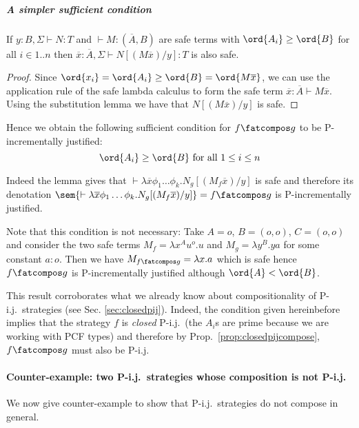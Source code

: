 \subparagraph{A simpler sufficient condition}
\begin{lemma}
If $y:B, \Sigma \vdash N : T$ and $\vdash M : (\overline{A}, B)$
are safe terms with $\ord{A_i} \geq \ord{B}$ for all $i\in 1..n$
then $\overline{x}:\overline{A}, \Sigma \vdash N[(M \overline{x})/y] :T$ is also safe.
\end{lemma}
\begin{proof}
Since $\ord{x_i} = \ord{A_i} \geq \ord{B} = \ord{M \overline{x}}$, we can use the application
rule of the safe lambda calculus to form the safe term $\overline{x}:\overline{A} \vdash M \overline{x}$.
Using the substitution lemma we have that $N[(M \overline{x})/y]$ is safe.
\end{proof}

Hence we obtain the following sufficient condition for $f\fatcompos
g$ to be P-incrementally justified:
$$\ord{A_i}\geq\ord{B} \mbox{ for all } 1 \leq i \leq n$$


Indeed the lemma gives that $\vdash \lambda \overline{x} \phi_1
\dots \phi_k. N_g [(M_f \overline{x}) / y]$ is safe and therefore
its denotation $\sem{\vdash \lambda \overline{x} \phi_1 \dots
\phi_k. N_g [(M_f \overline{x}) / y]} = f\fatcompos g$ is
P-incrementally justified.

Note that this condition is not necessary: Take $A=o$, $B=(o,o)$,
$C=(o,o)$ and consider the two safe terms $M_f = \lambda x^A u^o.u$
and $M_g = \lambda y^B . y a$ for  some constant $a:o$. Then we have
$M_{f\fatcompos g} = \lambda x . a$ which is safe hence $f\fatcompos
g$ is P-incrementally justified although $\ord{A} < \ord{B}$.

\begin{remark}
This result corroborates what we already know about compositionality
of P-i.j.\ strategies (see Sec. \ref{sec:closedpij}). Indeed, the
condition given hereinbefore implies that the strategy $f$ is
\emph{closed} P-i.j.\ (the $A_i$s are prime because we are working
with PCF types) and therefore by Prop.\ \ref{prop:closedpijcompose},
$f \fatcompos g$ must also be P-i.j.
\end{remark}




\paragraph{Counter-example: two P-i.j.\ strategies whose composition is not
P-i.j.}

We now give counter-example to show that P-i.j.\ strategies do not
compose in general.

